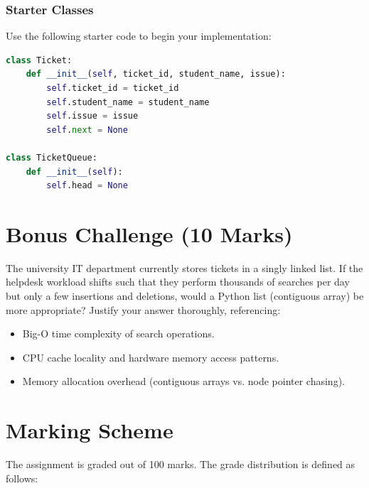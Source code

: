 \documentclass[11pt,a4paper]{article}
\begin{document}
\subsubsection*{Starter Classes}
Use the following starter code to begin your implementation:
\begin{lstlisting}[language=Python]
class Ticket:
    def __init__(self, ticket_id, student_name, issue):
        self.ticket_id = ticket_id
        self.student_name = student_name
        self.issue = issue
        self.next = None

class TicketQueue:
    def __init__(self):
        self.head = None
\end{lstlisting}

\vspace{0.4cm}
\section{Bonus Challenge (10 Marks)}
The university IT department currently stores tickets in a singly linked list. If the helpdesk workload shifts such that they perform thousands of searches per day but only a few insertions and deletions, would a Python list (contiguous array) be more appropriate? Justify your answer thoroughly, referencing:
\begin{itemize}
    \item Big-O time complexity of search operations.
    \item CPU cache locality and hardware memory access patterns.
    \item Memory allocation overhead (contiguous arrays vs. node pointer chasing).
\end{itemize}

\newpage

\section{Marking Scheme}
The assignment is graded out of 100 marks. The grade distribution is defined as follows:
\end{document}
